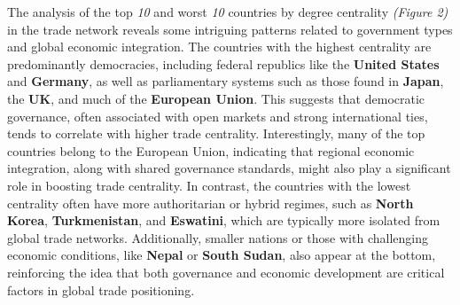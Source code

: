 \documentclass[12pt, a4paper]{article}
\begin{document}
The analysis of the top \textit{10} and worst \textit{10} countries by degree centrality \textit{(Figure 2)} in the trade network reveals some intriguing patterns related to government types and global economic integration. The countries with the highest centrality are predominantly democracies, including federal republics like the \textbf{United States} and \textbf{Germany}, as well as parliamentary systems such as those found in \textbf{Japan}, the \textbf{UK}, and much of the \textbf{European Union}. This suggests that democratic governance, often associated with open markets and strong international ties, tends to correlate with higher trade centrality. Interestingly, many of the top countries belong to the European Union, indicating that regional economic integration, along with shared governance standards, might also play a significant role in boosting trade centrality. In contrast, the countries with the lowest centrality often have more authoritarian or hybrid regimes, such as \textbf{North Korea}, \textbf{Turkmenistan}, and \textbf{Eswatini}, which are typically more isolated from global trade networks. Additionally, smaller nations or those with challenging economic conditions, like \textbf{Nepal} or \textbf{South Sudan}, also appear at the bottom, reinforcing the idea that both governance and economic development are critical factors in global trade positioning.\\
\end{document}
